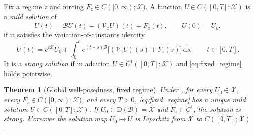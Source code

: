 \documentclass[11pt]{article}
\theoremstyle{plain}
\newtheorem{theorem}{Theorem}[section]
\theoremstyle{definition}
\theoremstyle{remark}
\newcommand{\X}{\mathcal{X}}
\newcommand{\Bop}{\mathcal{B}}
\newcommand{\Vop}{\mathcal{V}}
\newcommand{\dom}{\mathrm{D}}
\newcommand{\dd}{\mathrm{d}}
\begin{document}
Fix a regime $z$ and forcing $F_z\in C([0,\infty);\X)$. A function $U\in C([0,T];\X)$ is a
\emph{mild solution} of
\begin{equation}
\label{eq:fixed_regime}
\dot U(t)=\Bop U(t)+(\Vop_z U)(t)+F_z(t),\qquad U(0)=U_0,
\end{equation}
if it satisfies the variation-of-constants identity
\begin{equation}
\label{eq:voc}
U(t)=e^{t\Bop}U_0+\int_0^t e^{(t-s)\Bop}\big[(\Vop_z U)(s)+F_z(s)\big]\,\dd s,\qquad t\in[0,T].
\end{equation}
It is a \emph{strong solution} if in addition $U\in C^1([0,T];\X)$ and \eqref{eq:fixed_regime}
holds pointwise.

\begin{theorem}[Global well-posedness, fixed regime]
\label{thm:wellposed}
Under , for every $U_0\in\X$, every $F_z\in C([0,\infty);\X)$, and every
$T>0$, \eqref{eq:fixed_regime} has a unique mild solution $U\in C([0,T];\X)$. If
$U_0\in\dom(\Bop)=\X$ and $F_z\in C^1$, the solution is strong. Moreover the solution map
$U_0\mapsto U$ is Lipschitz from $\X$ to $C([0,T];\X)$.
\end{theorem}
\end{document}
